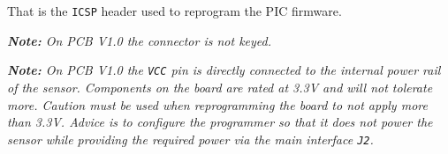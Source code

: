 \begin{multicols}{2}
	That is the \texttt{ICSP} header used to reprogram the PIC firmware.
	
	\textit{\textbf{Note:} On PCB V1.0 the connector is not keyed.}
	
	\textit{\textbf{Note:} On PCB V1.0 the \texttt{VCC} pin is directly connected to the internal power rail of the sensor. Components on the board are rated at 3.3V and will not tolerate more. Caution must be used when reprogramming the board to not apply more than 3.3V. Advice is to configure the programmer so that it does not power the sensor while providing the required power via the main interface \texttt{J2}.}
	
\end{multicols}